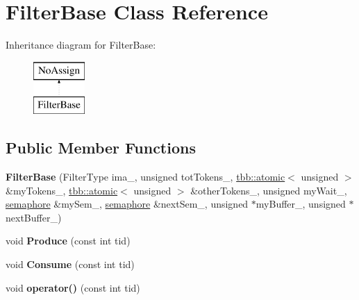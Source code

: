 \hypertarget{classFilterBase}{}\section{Filter\+Base Class Reference}
\label{classFilterBase}
Inheritance diagram for Filter\+Base\+:\begin{figure}[H]
\begin{center}
\leavevmode
\includegraphics[height=2.000000cm]{classFilterBase}
\end{center}
\end{figure}
\subsection*{Public Member Functions}
\begin{DoxyCompactItemize}
\item 
\hypertarget{classFilterBase_a147dd68ddf98a09ab2b3467298c04bad}{}{\bfseries Filter\+Base} (Filter\+Type ima\+\_\+, unsigned tot\+Tokens\+\_\+, \hyperlink{structtbb_1_1atomic}{tbb\+::atomic}$<$ unsigned $>$ \&my\+Tokens\+\_\+, \hyperlink{structtbb_1_1atomic}{tbb\+::atomic}$<$ unsigned $>$ \&other\+Tokens\+\_\+, unsigned my\+Wait\+\_\+, \hyperlink{classtbb_1_1internal_1_1semaphore}{semaphore} \&my\+Sem\+\_\+, \hyperlink{classtbb_1_1internal_1_1semaphore}{semaphore} \&next\+Sem\+\_\+, unsigned $\ast$my\+Buffer\+\_\+, unsigned $\ast$next\+Buffer\+\_\+)\label{classFilterBase_a147dd68ddf98a09ab2b3467298c04bad}

\item 
\hypertarget{classFilterBase_a6c3cb7dffcd4d85c632329c7be88a696}{}void {\bfseries Produce} (const int tid)\label{classFilterBase_a6c3cb7dffcd4d85c632329c7be88a696}

\item 
\hypertarget{classFilterBase_a0b42d4ec6c612bb4956585132216f571}{}void {\bfseries Consume} (const int tid)\label{classFilterBase_a0b42d4ec6c612bb4956585132216f571}

\item 
\hypertarget{classFilterBase_a5408b7337d6d0cd2084b5c3359a3b749}{}void {\bfseries operator()} (const int tid)\label{classFilterBase_a5408b7337d6d0cd2084b5c3359a3b749}

\end{DoxyCompactItemize}
